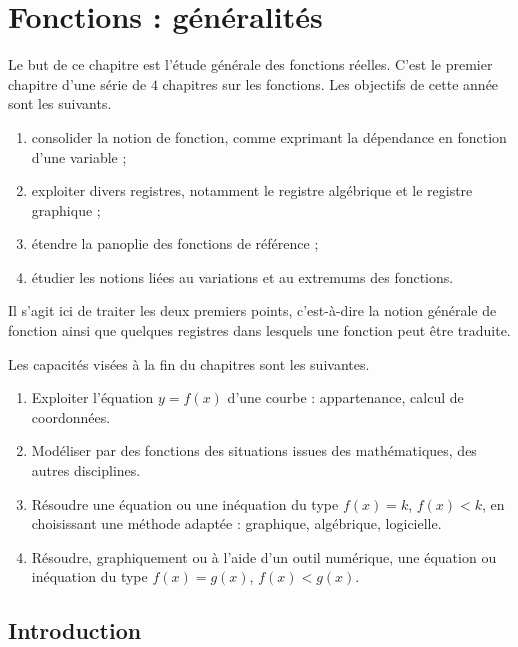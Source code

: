 \chapter{Fonctions : généralités}
\label{chap:fonc-gen}

Le but de ce chapitre est l'étude générale des fonctions réelles.
C'est le premier chapitre d'une série de $4$ chapitres sur les fonctions.
Les objectifs de cette année sont les suivants.
	\begin{enumerate}[label=$\bullet$]
		\item consolider la notion de fonction, comme exprimant la dépendance en fonction d'une variable ; 
		\item exploiter divers registres, notamment le registre algébrique et le registre graphique ;
		\item étendre la panoplie des fonctions de référence ;
		\item étudier les notions liées au variations et au extremums des fonctions.
	\end{enumerate}
Il s'agit ici de traiter les deux premiers points, c'est-à-dire la notion générale de fonction ainsi que quelques registres dans lesquels une fonction peut être traduite.

Les capacités visées à la fin du chapitres sont les suivantes.
	\begin{enumerate}
		\item Exploiter l'équation $y=f(x)$ d'une courbe : appartenance, calcul de coordonnées.
		\item Modéliser par des fonctions des situations issues des mathématiques, des autres disciplines.
		\item Résoudre une équation ou une inéquation du type $f(x)=k$, $f(x) < k$, en choisissant une méthode adaptée : graphique, algébrique, logicielle.
		\item Résoudre, graphiquement ou à l'aide d'un outil numérique, une équation ou inéquation du type $f(x)=g(x)$, $f(x) < g(x)$.
	\end{enumerate}

	\section{Introduction}
	
